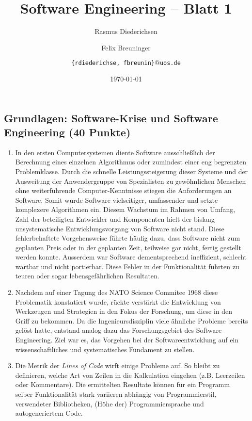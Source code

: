 \documentclass{scrartcl}
\title{\rmfamily Software Engineering -- Blatt 1}
\author{Rasmus Diederichsen \and Felix Breuninger\and %
   \texttt{\{rdiederichse, fbreunin\}$@$uos.de}
}
\date{\today}
\begin{document}
\selectfont
\maketitle


\setcounter{section}{1}
\setcounter{subsection}{1}
\subsection{Grundlagen: Software-Krise und Software Engineering (40 Punkte)}

\begin{enumerate} 
   \item In den ersten Computersystemen diente Software ausschließlich der
      Berechnung eines einzelnen Algorithmus oder zumindest einer eng begrenzten
      Problemklasse. Durch die schnelle Leistungssteigerung dieser Systeme und
      der Ausweitung der Anwendergruppe von Spezialisten zu gewöhnlichen
      Menschen ohne weiterführende Computer-Kenntnisse stiegen die Anforderungen
      an Software. Somit wurde Software vielseitiger, umfassender und setzte
      komplexere Algorithmen ein. Diesem Wachstum im Rahmen von Umfang, Zahl der
      beteiligten Entwickler und Komponenten hielt der bislang unsystematische
      Entwicklungsvorgang von Software nicht stand. Diese fehlerbehaftete
      Vorgehensweise führte häufig dazu, dass Software nicht zum geplanten Preis
      oder in der geplanten Zeit, teilweise gar nicht, fertig gestellt werden
      konnte. Ausserdem war Software dementsprechend ineffizient, schlecht
      wartbar und nicht portierbar. Diese Fehler in der Funktionalität führten
      zu teuren oder sogar lebensgefährlichen Resultaten.  
   \item Nachdem auf einer Tagung des NATO Science Commitee 1968 diese
      Problematik konstatiert wurde, rückte verstärkt die Entwicklung
      von Werkzeugen und Strategien in den Fokus der Forschung, um diese in
      den Griff zu bekommen. Da die Ingenieursdisziplin viele ähnliche
      Probleme  bereits gelöst hatte, entstand analog dazu das
      Forschungsgebiet des Software Engineering.  Ziel war es, das Vorgehen
      bei der Softwareentwicklung auf ein wissenschaftliches und
      systematisches Fundament zu stellen.  
   \item Die Metrik der \textit{Lines of Code} wirft einige Probleme auf. So
      bleibt zu definieren, welche Art von Zeilen in die Kalkulation eingehen
      (z.B.  Leerzeilen oder Kommentare). Die ermittelten Resultate können für
      ein Programm selber Funktionalität stark variieren abhängig von
      Programmierstil, verwendeter Bibliotheken, (Höhe der) Programmiersprache
      und autogeneriertem Code.  
\end{enumerate}
\end{document}
